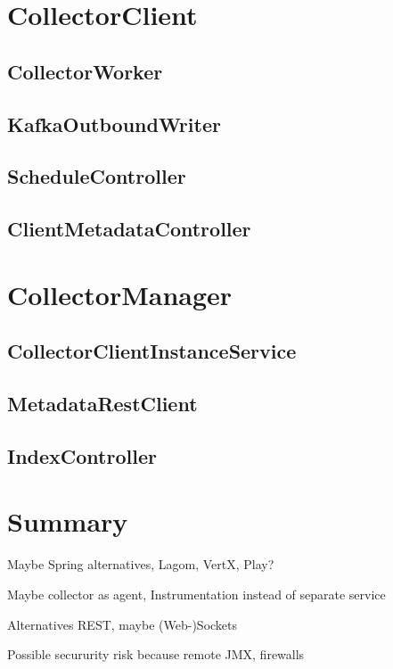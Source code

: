 \section{CollectorClient}

\subsection{CollectorWorker}

\subsection{KafkaOutboundWriter}

\subsection{ScheduleController}

\subsection{ClientMetadataController}

\section{CollectorManager}

\subsection{CollectorClientInstanceService}

\subsection{MetadataRestClient}

\subsection{IndexController}

\section{Summary}

Maybe Spring alternatives, Lagom, VertX, Play?

Maybe collector as agent, Instrumentation instead of separate service

Alternatives REST, maybe (Web-)Sockets

Possible secururity risk because remote JMX, firewalls